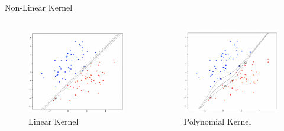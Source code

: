 \begin{frame}[fragile]{Non-Linear Kernel}
  \begin{columns}[onlytextwidth, T, c]
    \begin{column}{.5\textwidth}
        \begin{figure}
            \includegraphics[width=5cm]{assets/images/s4.01.png}
            \caption{Linear Kernel}
        \end{figure}
    \end{column}
    \begin{column}{.5\textwidth}
        \begin{figure}
            \includegraphics[width=5cm]{assets/images/s4.02.png}
            \caption{Polynomial Kernel}
        \end{figure}
    \end{column}    
  \end{columns}
\end{frame}
